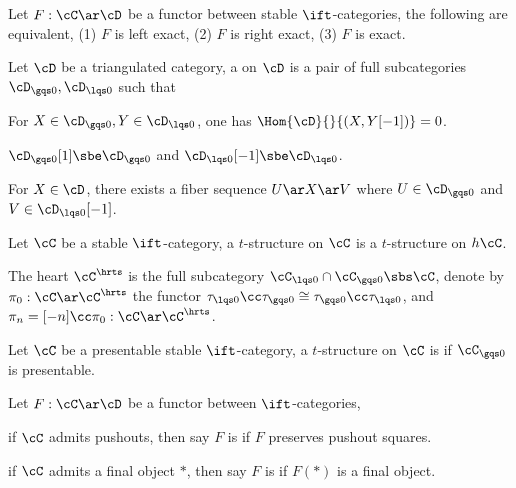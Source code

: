 \documentclass[article, a4paper, twoside]{universal}
\begin{document}
\begin{thm}[1.1.4.1]
    Let $F:\cC\ar\cD$ be a functor between stable $\ift$-categories, the following are equivalent, (1) $F$ is left exact, (2) $F$ is right exact, (3) $F$ is exact.
\end{thm}


\begin{dfn}[1.2.1.1]
    Let $\cD$ be a triangulated category, a  on $\cD$ is a pair of full subcategories $\cD_{\gqs0},\cD_{\lqs0}$ such that
    \begin{enr}[label=(\arabic*)]
        \item For $X\in\cD_{\gqs0}, Y\in\cD_{\lqs0}$, one has $\Hom{\cD}{}{(X,Y[-1])}=0$.
        \item $\cD_{\gqs0}[1]\sbe\cD_{\gqs0}$ and $\cD_{\lqs0}[-1]\sbe\cD_{\lqs0}$.
        \item For $X\in\cD$, there exists a fiber sequence $U\ar X\ar V$ where $U\in\cD_{\gqs0}$ and $V\in\cD_{\lqs0}[-1]$.
    \end{enr}
\end{dfn}


\begin{dfn}[1.2.1.4, 1.2.1.11]
    Let $\cC$ be a stable $\ift$-category, a $t$-structure on $\cC$ is a $t$-structure on $h\cC$.

    The heart $\cC^{\hrts}$ is the full subcategory $\cC_{\lqs0}\cap\cC_{\gqs0}\sbs\cC$, denote by $\pi_{0}:\cC\ar\cC^{\hrts}$ the functor $\tau_{\lqs0}\cc\tau_{\gqs0}\cong\tau_{\gqs0}\cc\tau_{\lqs0}$, and $\pi_{n}=[-n]\cc\pi_{0}:\cC\ar\cC^{\hrts}$.
\end{dfn}


\begin{thm}[1.4.4.12]
    Let $\cC$ be a presentable stable $\ift$-category, a $t$-structure on $\cC$ is  if $\cC_{\gqs0}$ is presentable.

\end{thm}



\begin{dfn}[1.4.2.1]
    Let $F:\cC\ar\cD$ be a functor between $\ift$-categories,
    \begin{enr}[label=(\arabic*)]
        \item if $\cC$ admits pushouts, then say $F$ is  if $F$ preserves pushout squares.
        \item if $\cC$ admits a final object $*$, then say $F$ is  if $F(*)$ is a final object.
    \end{enr}
\end{dfn}
\end{document}
